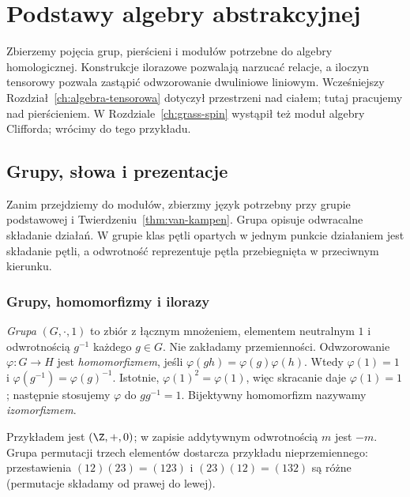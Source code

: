 \chapter{Podstawy algebry abstrakcyjnej}
\label{ch:algebra-abstrakcyjna}

\providecommand{\atlasref}[2]{#2}

Zbierzemy pojęcia grup, pierścieni i modułów potrzebne
do algebry homologicznej. Konstrukcje ilorazowe pozwalają
narzucać relacje, a iloczyn tensorowy pozwala zastąpić
odwzorowanie dwuliniowe liniowym. Wcześniejszy
Rozdział~\ref{ch:algebra-tensorowa} dotyczył przestrzeni
nad ciałem; tutaj pracujemy nad pierścieniem.
W Rozdziale~\ref{ch:grass-spin} wystąpił też moduł
algebry Clifforda; wrócimy do tego przykładu.

\section{Grupy, słowa i prezentacje}
\label{sec:grupy-prezentacje-5}

Zanim przejdziemy do modułów, zbierzmy język
potrzebny przy grupie podstawowej i
Twierdzeniu~\ref{thm:van-kampen}. Grupa opisuje
odwracalne składanie działań. W grupie klas
pętli opartych w jednym punkcie działaniem
jest składanie pętli, a odwrotność reprezentuje
pętla przebiegnięta w przeciwnym kierunku.

\subsection*{Grupy, homomorfizmy i ilorazy}

\begin{definicja}
\label{def:grupa-hom-5}
\emph{Grupa} $(G,\cdot,1)$ to zbiór z łącznym
mnożeniem, elementem neutralnym $1$ i
odwrotnością $g^{-1}$ każdego $g\in G$.
Nie zakładamy przemienności. Odwzorowanie
$\varphi:G\to H$ jest \emph{homomorfizmem},
jeśli $\varphi(gh)=\varphi(g)\varphi(h)$.
Wtedy $\varphi(1)=1$ i
$\varphi(g^{-1})=\varphi(g)^{-1}$.
Istotnie, $\varphi(1)^2=\varphi(1)$, więc skracanie daje
$\varphi(1)=1$; następnie stosujemy $\varphi$ do $gg^{-1}=1$.
Bijektywny homomorfizm nazywamy \emph{izomorfizmem}.
\end{definicja}

Przykładem jest $(\Z,+,0)$;
w zapisie addytywnym odwrotnością $m$
jest $-m$. Grupa permutacji trzech
elementów dostarcza przykładu
nieprzemiennego: przestawienia
$(12)(23)=(123)$ i $(23)(12)=(132)$ są różne
(permutacje składamy od prawej do lewej).

